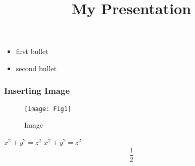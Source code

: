 \documentclass{beamer}
\title{My Presentation}
\begin{document}
	\begin{frame}
	\titlepage
	\end{frame}
	
	
	\begin{frame}
		\begin{itemize}
		\item first bullet
		\item second bullet
		\cite{gatta2017generating}
		\end{itemize}
	\end{frame}
	
	\begin{frame}
		\frametitle{Inserting Image}
		\begin{figure}
		\texttt{[image: Fig1]}
		\caption{Image}
		\end{figure}
	\end{frame}
	
	\begin{frame}
		\(x^2 + y^2 = z^2 \) 
		$ x^2 + y^2 = z^2 $
		\[ \dfrac{1}{2} \]
		
	\end{frame}
	\begin{frame}
	
	
	\end{frame}
\end{document}
